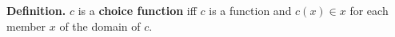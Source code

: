 \textbf{Definition.} $c$ is a \textbf{choice function} iff $c$ is a function and $c(x) \in x$ for each member $x$ of the domain of $c$.
